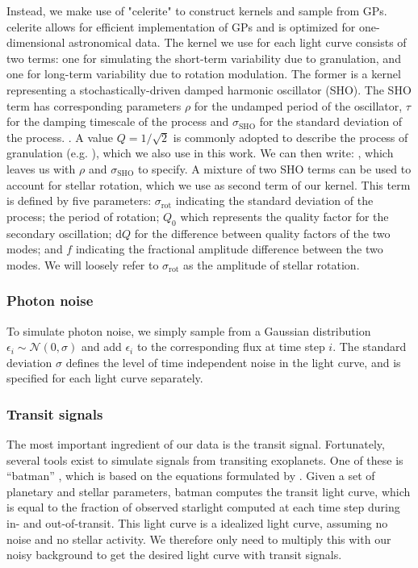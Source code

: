 Instead, we make use of "celerite" \cite{foreman2017fast} to construct kernels and sample from GPs. celerite allows for efficient implementation of GPs and is optimized for one-dimensional astronomical data. The kernel we use for each light curve consists of two terms: one for simulating the short-term variability due to granulation, and one for long-term variability due to rotation modulation. The former is a kernel representing a stochastically-driven damped harmonic oscillator (SHO). The SHO term has corresponding parameters $\rho$ for the undamped period of the oscillator, $\tau$ for the damping timescale of the process and $\sigma_\text{SHO}$ for the standard deviation of the process. . A value $Q=1/\sqrt{2}$ is commonly adopted to describe the process of granulation (e.g. \cite{barros2020improving}), which we also use in this work. We can then write: , which leaves us with $\rho$ and $\sigma_\text{SHO}$ to specify. A mixture of two SHO terms can be used to account for stellar rotation, which we use as second term of our kernel. This term is defined by five parameters:  $\sigma_\text{rot}$ indicating the standard deviation of the process; the period of rotation; $Q_0$ which represents the quality factor for the secondary oscillation; $\text{d}Q$ for the difference between quality factors of the two modes; and $f$ indicating the fractional amplitude difference between the two modes. We will loosely refer to $\sigma_\text{rot}$ as the amplitude of stellar rotation.

\subsubsection{Photon noise}
To simulate photon noise, we simply sample from a Gaussian distribution $\epsilon_i \sim \mathcal{N}(0, \sigma)$ and add $\epsilon_i$ to the corresponding flux at time step $i$. The standard deviation $\sigma$ defines the level of time independent noise in the light curve, and is specified for each light curve separately.

\subsubsection{Transit signals}
The most important ingredient of our data is the transit signal. Fortunately, several tools exist to simulate signals from transiting exoplanets. One of these is “batman” \citep{kreidberg2015batman}, which is based on the equations formulated by \cite{mandel2002analytic}. Given a set of planetary and stellar parameters, batman computes the transit light curve, which is equal to the fraction of observed starlight computed at each time step during in- and out-of-transit. This light curve is a idealized light curve, assuming no noise and no stellar activity. We therefore only need to multiply this with our noisy background to get the desired light curve with transit signals. 

